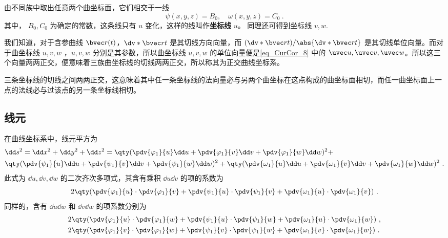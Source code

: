 由不同族中取出任意两个曲坐标面，它们相交于一线
\begin{equation}
\psi(x,y,z)=B_0,\quad \omega(x,y,z)=C_0~.
\end{equation}
其中， $B_0,C_0$ 为确定的常数，这条线只有 $u$ 变化，这样的线叫作\textbf{坐标线} $u$。 同理还可得到坐标线 $v,w$.

我们知道，对于含参曲线 $\bvec r(t)$，$\dv*{\bvec r}{t}$ 是其切线方向向量，而 $(\dv*{\bvec r}{t})/\abs{\dv*{\bvec r}{t}}$ 是其切线单位向量。而对于曲坐标线 $u,v,w$ ，$u,v,w$ 分别是其参数，所以曲坐标线 $u,v,w$ 的单位向量便是\autoref{eq_CurCor_8} 中的 $\uvec u,\uvec v,\uvec w$。所以这三个向量两两正交，便意味着三族曲坐标线的切线两两正交，所以称其为正交曲线坐标系。

三条坐标线的切线之间两两正交，这意味着其中任一条坐标线的法向量必与另两个曲坐标在这点构成的曲坐标面相切，而任一曲坐标面上一点的法线必与过该点的另一条坐标线相切。

\subsection{线元}
在曲线坐标系中，线元平方为
\begin{equation}\label{eq_CurCor_1}
\begin{aligned}
&\dd s^2=\dd x^2+\dd y^2+\dd z^2=\qty(\pdv{\varphi_1}{u}\dd u+\pdv{\varphi_1}{v}\dd v+\pdv{\varphi_1}{w}\dd w)^2+\\ 
&\qty(\pdv{\psi_1}{u}\dd u+\pdv{\psi_1}{v}\dd v+\pdv{\psi_1}{w}\dd w)^2+\qty(\pdv{\omega_1}{u}\dd u+\pdv{\omega_1}{v}\dd v+\pdv{\omega_1}{w}\dd w)^2~.
\end{aligned}
\end{equation}
此式为 $\dd u,\dd v,\dd w$ 的二次齐次多项式，其含有乘积 $\dd u \dd v$ 的项的系数为
\begin{equation}
2\qty(\pdv{\varphi_1}{u}\cdot\pdv{\varphi_1}{v}+\pdv{\psi_1}{u}\cdot\pdv{\psi_1}{v}+\pdv{\omega_1}{u}\cdot\pdv{\omega_1}{v})~.
\end{equation}
同样的，含有 $\dd u\dd w$ 和 $\dd v\dd w$ 的项系数分别为
\begin{equation}
\begin{aligned}
& 2\qty(\pdv{\varphi_1}{u}\cdot\pdv{\varphi_1}{w}+\pdv{\psi_1}{u}\cdot\pdv{\psi_1}{w}+\pdv{\omega_1}{u}\cdot\pdv{\omega_1}{w})~,\\
&2\qty(\pdv{\varphi_1}{v}\cdot\pdv{\varphi_1}{w}+\pdv{\psi_1}{v}\cdot\pdv{\psi_1}{w}+\pdv{\omega_1}{v}\cdot\pdv{\omega_1}{w})~.
\end{aligned}
\end{equation}

